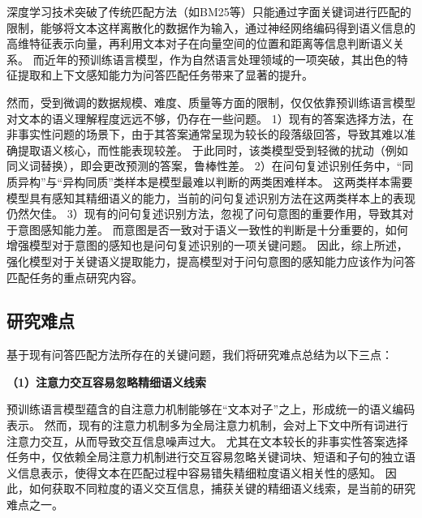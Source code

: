
深度学习技术突破了传统匹配方法（如BM25等）只能通过字面关键词进行匹配的限制，能够将文本这样离散化的数据作为输入，通过神经网络编码得到语义信息的高维特征表示向量，再利用文本对子在向量空间的位置和距离等信息判断语义关系。
而近年的预训练语言模型，作为自然语言处理领域的一项突破，其出色的特征提取和上下文感知能力为问答匹配任务带来了显著的提升。

然而，受到微调的数据规模、难度、质量等方面的限制，仅仅依靠预训练语言模型对文本的语义理解程度远远不够，仍存在一些问题。
1）现有的答案选择方法，在非事实性问题的场景下，由于其答案通常呈现为较长的段落级回答，导致其难以准确提取语义核心，而性能表现较差。
于此同时，该类模型受到轻微的扰动（例如同义词替换），即会更改预测的答案，鲁棒性差。
2）在问句复述识别任务中，“同质异构”与“异构同质”类样本是模型最难以判断的两类困难样本。
这两类样本需要模型具有感知其精细语义的能力，当前的问句复述识别方法在这两类样本上的表现仍然欠佳。
3）现有的问句复述识别方法，忽视了问句意图的重要作用，导致其对于意图感知能力差。
而意图是否一致对于语义一致性的判断是十分重要的，如何增强模型对于意图的感知也是问句复述识别的一项关键问题。
因此，综上所述，强化模型对于关键语义提取能力，提高模型对于问句意图的感知能力应该作为问答匹配任务的重点研究内容。


\subsection{研究难点}

基于现有问答匹配方法所存在的关键问题，我们将研究难点总结为以下三点：

\textbf{\songti （1）注意力交互容易忽略精细语义线索}

预训练语言模型蕴含的自注意力机制能够在“文本对子”之上，形成统一的语义编码表示。
然而，现有的注意力机制多为全局注意力机制，会对上下文中所有词进行注意力交互，从而导致交互信息噪声过大。
尤其在文本较长的非事实性答案选择任务中，仅依赖全局注意力机制进行交互容易忽略关键词块、短语和子句的独立语义信息表示，使得文本在匹配过程中容易错失精细粒度语义相关性的感知。
因此，如何获取不同粒度的语义交互信息，捕获关键的精细语义线索，是当前的研究难点之一。

